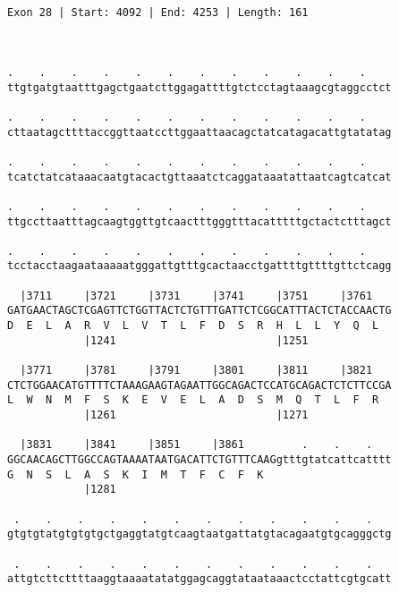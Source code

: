 \documentclass{article}
\begin{document}
\begin{Verbatim}
                                
 
Exon 28 | Start: 4092 | End: 4253 | Length: 161



.    .    .    .    .    .    .    .    .    .    .    .    
ttgtgatgtaatttgagctgaatcttggagattttgtctcctagtaaagcgtaggcctct
                                                            
.    .    .    .    .    .    .    .    .    .    .    .    
cttaatagcttttaccggttaatccttggaattaacagctatcatagacattgtatatag
                                                            
.    .    .    .    .    .    .    .    .    .    .    .    
tcatctatcataaacaatgtacactgttaaatctcaggataaatattaatcagtcatcat
                                                            
.    .    .    .    .    .    .    .    .    .    .    .    
ttgccttaatttagcaagtggttgtcaactttgggtttacatttttgctactctttagct
                                                            
.    .    .    .    .    .    .    .    .    .    .    .    
tcctacctaagaataaaaatgggattgtttgcactaacctgattttgttttgttctcagg
                                                            
  |3711     |3721     |3731     |3741     |3751     |3761   
GATGAACTAGCTCGAGTTCTGGTTACTCTGTTTGATTCTCGGCATTTACTCTACCAACTG
D  E  L  A  R  V  L  V  T  L  F  D  S  R  H  L  L  Y  Q  L  
            |1241                         |1251             
  
  |3771     |3781     |3791     |3801     |3811     |3821   
CTCTGGAACATGTTTTCTAAAGAAGTAGAATTGGCAGACTCCATGCAGACTCTCTTCCGA
L  W  N  M  F  S  K  E  V  E  L  A  D  S  M  Q  T  L  F  R  
            |1261                         |1271             
  
  |3831     |3841     |3851     |3861         .    .    .   
GGCAACAGCTTGGCCAGTAAAATAATGACATTCTGTTTCAAGgtttgtatcattcatttt
G  N  S  L  A  S  K  I  M  T  F  C  F  K                    
            |1281                                           
  
 .    .    .    .    .    .    .    .    .    .    .    .   
gtgtgtatgtgtgtgctgaggtatgtcaagtaatgattatgtacagaatgtgcagggctg
                                                            
 .    .    .    .    .    .    .    .    .    .    .    .   
attgtcttcttttaaggtaaaatatatggagcaggtataataaactcctattcgtgcatt
                                                            

\end{Verbatim}
\end{document}
